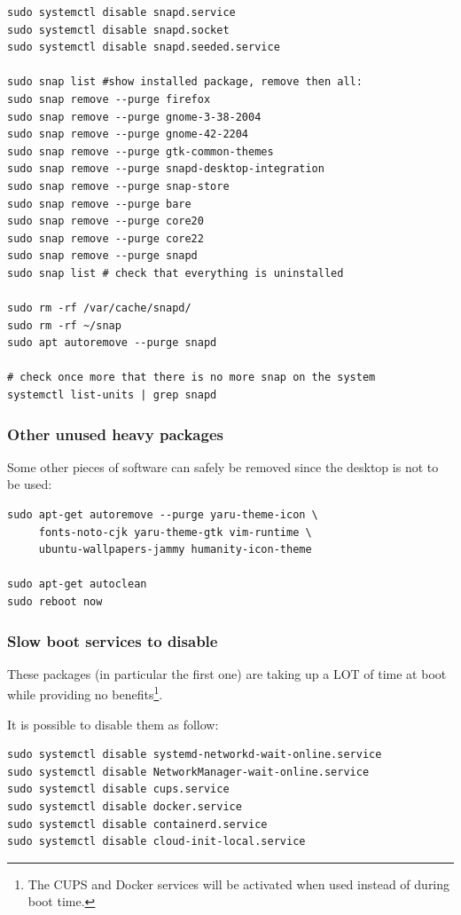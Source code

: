 \documentclass[10pt]{article}
\begin{document}
\begin{verbatim}
sudo systemctl disable snapd.service
sudo systemctl disable snapd.socket
sudo systemctl disable snapd.seeded.service

sudo snap list #show installed package, remove then all:
sudo snap remove --purge firefox
sudo snap remove --purge gnome-3-38-2004
sudo snap remove --purge gnome-42-2204
sudo snap remove --purge gtk-common-themes
sudo snap remove --purge snapd-desktop-integration
sudo snap remove --purge snap-store
sudo snap remove --purge bare
sudo snap remove --purge core20
sudo snap remove --purge core22
sudo snap remove --purge snapd
sudo snap list # check that everything is uninstalled

sudo rm -rf /var/cache/snapd/
sudo rm -rf ~/snap
sudo apt autoremove --purge snapd

# check once more that there is no more snap on the system
systemctl list-units | grep snapd 
\end{verbatim}

\subsubsection{Other unused heavy packages}
\label{sec:orgaca74e6}
Some other pieces of software can safely be removed since the desktop is
not to be used:

\begin{verbatim}
sudo apt-get autoremove --purge yaru-theme-icon \
     fonts-noto-cjk yaru-theme-gtk vim-runtime \
     ubuntu-wallpapers-jammy humanity-icon-theme

sudo apt-get autoclean
sudo reboot now
\end{verbatim}

\subsubsection{Slow boot services to disable}
\label{sec:org34bba21}
These packages (in particular the first one) are taking up a LOT of time at boot while providing no benefits\footnote{The CUPS and Docker services will be activated when used instead of during boot time.}.

It is possible to disable them as follow:
\begin{verbatim}
sudo systemctl disable systemd-networkd-wait-online.service
sudo systemctl disable NetworkManager-wait-online.service
sudo systemctl disable cups.service
sudo systemctl disable docker.service
sudo systemctl disable containerd.service
sudo systemctl disable cloud-init-local.service
\end{verbatim}
\end{document}
